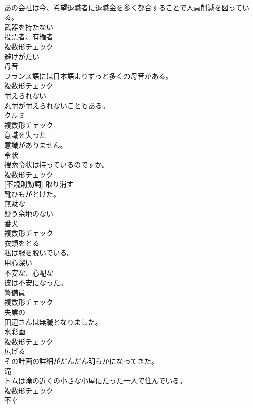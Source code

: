 \documentclass[8pt]{extreport}
\begin{document}
\begin{CJK}{UTF8}{min}
\\	あの会社は今、希望退職者に退職金を多く都合することで人員削減を図っている。	
\\	[形容詞]	武器を持たない	
\\	[名詞]	投票者、有権者	
\\	複数形チェック
\\	[形容詞]	避けがたい	
\\	[名詞]	母音	
\\	フランス語には日本語よりずっと多くの母音がある。	
\\	複数形チェック
\\	[形容詞]	耐えられない	
\\	忍耐が耐えられないこともある。	
\\	[名詞]	クルミ	
\\	複数形チェック
\\	[形容詞]	意識を失った	
\\	意識がありません。	
\\	[名詞]	令状	
\\	捜索令状は持っているのですか。	
\\	複数形チェック
\\	[動詞] [不規則動詞]	取り消す	
\\	靴ひもがとけた。	
\\	[形容詞]	無駄な	
\\	[形容詞]	疑う余地のない	
\\	[名詞]	番犬	
\\	複数形チェック
\\	[動詞]	衣類をとる	
\\	私は服を脱いでいる。	
\\	[形容詞]	用心深い	
\\	[形容詞]	不安な、心配な	
\\	彼は不安になった。	
\\	[名詞]	警備員	
\\	複数形チェック
\\	[形容詞]	失業の	
\\	田辺さんは無職となりました。	
\\	[名詞]	水彩画	
\\	複数形チェック
\\	[動詞]	広げる	
\\	その計画の詳細がだんだん明らかになってきた。	
\\	[名詞]	滝	
\\	トムは滝の近くの小さな小屋にたった一人で住んでいる。	
\\	複数形チェック
\\	[名詞]	不幸	

\end{CJK}
\end{document}
